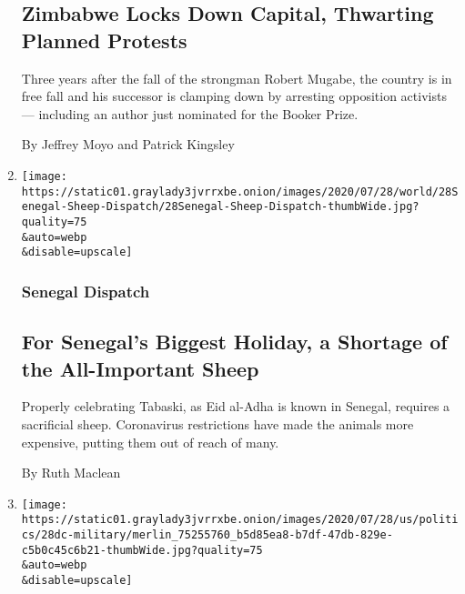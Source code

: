 \begin{enumerate}
  \hypertarget{zimbabwe-locks-down-capital-thwarting-planned-protests}{%
  \subsection{Zimbabwe Locks Down Capital, Thwarting Planned
  Protests}\label{zimbabwe-locks-down-capital-thwarting-planned-protests}}

  Three years after the fall of the strongman Robert Mugabe, the country
  is in free fall and his successor is clamping down by arresting
  opposition activists --- including an author just nominated for the
  Booker Prize.

  By Jeffrey Moyo and Patrick Kingsley
\item
  \href{/2020/07/29/world/africa/senegal-tabaski-sheep-eid-adha.html}{}

  \texttt{[image: https://static01.graylady3jvrrxbe.onion/images/2020/07/28/world/28Senegal-Sheep-Dispatch/28Senegal-Sheep-Dispatch-thumbWide.jpg?quality=75\\\&auto=webp\\\&disable=upscale]}

  \hypertarget{senegal-dispatch}{%
  \subsubsection{Senegal Dispatch}\label{senegal-dispatch}}

  \hypertarget{for-senegals-biggest-holiday-a-shortage-of-the-all-important-sheep}{%
  \subsection{For Senegal's Biggest Holiday, a Shortage of the
  All-Important
  Sheep}\label{for-senegals-biggest-holiday-a-shortage-of-the-all-important-sheep}}

  Properly celebrating Tabaski, as Eid al-Adha is known in Senegal,
  requires a sacrificial sheep. Coronavirus restrictions have made the
  animals more expensive, putting them out of reach of many.

  By Ruth Maclean
\item
  \href{/2020/07/28/world/africa/pentagon-somalia-civilian-casualties.html}{}

  \texttt{[image: https://static01.graylady3jvrrxbe.onion/images/2020/07/28/us/politics/28dc-military/merlin\_75255760\_b5d85ea8-b7df-47db-829e-c5b0c45c6b21-thumbWide.jpg?quality=75\\\&auto=webp\\\&disable=upscale]}

  \hypertarget{pentagon-admits-to-civilian-casualties-in-somalia-for-a-third-time}{%
}
\end{enumerate}
